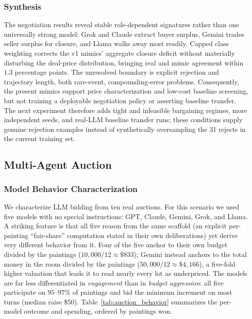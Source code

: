\documentclass[conference]{IEEEtran}
\begin{document}
\subsubsection{Synthesis}

The negotiation results reveal stable role-dependent signatures rather than one universally strong model: Grok and Claude extract buyer surplus, Gemini trades seller surplus for closure, and Llama walks away most readily. Capped class weighting corrects the v1 mimics' aggregate closure deficit without materially disturbing the deal-price distribution, bringing real and mimic agreement within $1.3$ percentage points. The unresolved boundary is explicit rejection and trajectory length, both rare-event, compounding-error problems. Consequently, the present mimics support price characterization and low-cost baseline screening, but not training a deployable negotiation policy or asserting baseline transfer. The next experiment therefore adds tight and infeasible bargaining regimes, more independent seeds, and real-LLM baseline transfer runs; these conditions supply genuine rejection examples instead of synthetically oversampling the 31 rejects in the current training set.

\subsection{Multi-Agent Auction}

\subsubsection{Model Behavior Characterization}
We characterize LLM bidding from ten real auctions. For this scenario we used five models with no special instructions: GPT, Claude, Gemini, Grok, and Llama. A striking feature is that all five reason from the same scaffold (an explicit per-painting ``fair-share'' computation stated in their own deliberations) yet derive very different behavior from it. Four of the five anchor to their own budget divided by the paintings ($10{,}000/12 \approx \$833$); Gemini instead anchors to the total money in the room divided by the paintings ($50{,}000/12 \approx \$4{,}166$), a five-fold higher valuation that leads it to read nearly every lot as underpriced. The models are far less differentiated in \emph{engagement} than in \emph{budget aggression}: all five participate on $95$--$97\%$ of paintings and bid the minimum increment on most turns (median raise \$50). Table~\ref{tab:auction_behavior} summarizes the per-model outcome and spending, ordered by paintings won.
\end{document}
